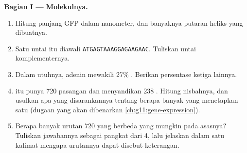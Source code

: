 \begin{problem}
\medskip
\noindent\textbf{Bagian I --- Molekulnya.}
\begin{enumerate}
  \item Hitung panjang  GFP dalam nanometer, dan banyaknya putaran
        heliks yang dibuatnya.
  \item Satu untai  itu diawali \texttt{ATGAGTAAAGGAGAAGAAC}.
        Tuliskan untai komplementernya.
  \item Dalam  utuhnya, adenin mewakili 27\% . Berikan
        persentase ketiga  lainnya.
  \item {} itu punya 720 pasangan  dan menyandikan 238 .
        Hitung nisbahnya, dan usulkan apa yang disarankannya tentang
        berapa banyak  yang menetapkan satu  (dugaan yang
        akan dibenarkan \cref{ch:g11:gene-expression}).
  \item Berapa banyak urutan 720  yang berbeda yang mungkin pada
        asasnya? Tuliskan jawabannya sebagai pangkat dari 4, lalu
        jelaskan dalam satu kalimat mengapa urutannya dapat disebut keterangan.
\end{enumerate}


\end{problem}
